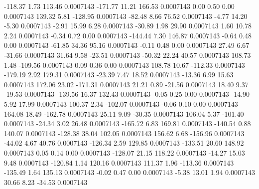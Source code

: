      -118.37        1.73      113.46     0.0007143
     -171.77       11.21      166.53     0.0007143
        0.00        0.50        0.00     0.0007143
      139.32        5.81     -128.95     0.0007143
      -82.48        8.66       76.52     0.0007143
       -4.77       14.20       -5.30     0.0007143
       -2.91       15.99        6.28     0.0007143
      -30.89        1.98       29.90     0.0007143
        1.60       10.78        2.24     0.0007143
       -0.34        0.72        0.00     0.0007143
     -144.44        7.30      146.87     0.0007143
       -0.64        0.48        0.00     0.0007143
      -61.85       34.36       95.16     0.0007143
       -0.11        0.48        0.00     0.0007143
       27.49        6.67      -31.66     0.0007143
       31.64        9.58      -23.51     0.0007143
      -50.32       22.24       40.57     0.0007143
      108.73        1.48     -109.56     0.0007143
        0.09        0.36        0.00     0.0007143
      108.78       10.67     -112.33     0.0007143
     -179.19        2.92      179.31     0.0007143
      -23.39        7.47       18.52     0.0007143
      -13.36        6.99       15.63     0.0007143
      172.06       23.02     -171.31     0.0007143
       21.21        0.89      -21.56     0.0007143
       18.40        9.37      -19.53     0.0007143
     -139.56       16.37      132.43     0.0007143
       -0.05        0.25        0.00     0.0007143
      -14.90        5.92       17.99     0.0007143
      100.37        2.34     -102.07     0.0007143
       -0.06        0.10        0.00     0.0007143
      164.08       18.49     -162.78     0.0007143
       25.11        9.09      -30.35     0.0007143
      106.04        5.37     -101.40     0.0007143
      -24.34        3.02       26.48     0.0007143
     -165.72        6.83      169.81     0.0007143
     -140.54        0.88      140.07     0.0007143
     -128.38       38.04      102.05     0.0007143
      156.62        6.68     -156.96     0.0007143
      -44.02        4.67       40.76     0.0007143
     -126.34        2.59      129.85     0.0007143
     -133.51       20.60      148.92     0.0007143
        0.05        0.14        0.00     0.0007143
     -128.07       21.15      118.22     0.0007143
      -14.27       15.03        9.48     0.0007143
     -120.84        1.14      120.16     0.0007143
      111.37        1.96     -113.36     0.0007143
     -135.49        1.64      135.13     0.0007143
       -0.02        0.47        0.00     0.0007143
       -5.38       13.01        1.94     0.0007143
       30.66        8.23      -34.53     0.0007143
